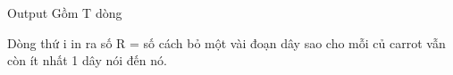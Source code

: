 Output
Gồm T dòng

Dòng thứ i in ra số R = số cách bỏ một vài đoạn dây sao cho mỗi củ carrot vẫn còn ít nhất 1 dây nói đến nó.